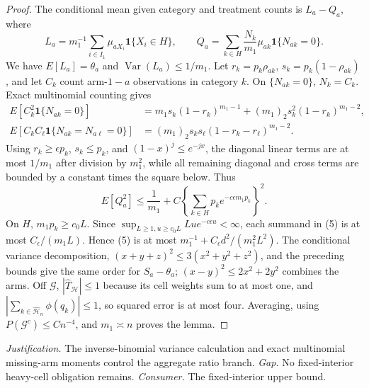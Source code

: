 \documentclass{article}
\begin{document}
\begin{proof}
The conditional mean given category and treatment counts is \(L_a-Q_a\), where
\[
L_a=m_1^{-1}\sum_{i\in I_1}\mu_{aX_i}\mathbf1\{X_i\in H\},\qquad Q_a=\sum_{k\in H}\frac{N_k}{m_1}\mu_{ak}\mathbf1\{N_{ak}=0\}.
\tag{3}
\]
We have \(E[L_a]=\theta_a\) and \(\operatorname{Var}(L_a)\le1/m_1\). Let \(r_k=p_k\rho_{ak}\), \(s_k=p_k(1-\rho_{ak})\), and let \(C_k\) count arm-\(1-a\) observations in category \(k\). On \(\{N_{ak}=0\}\), \(N_k=C_k\). Exact multinomial counting gives
\[
\begin{aligned}
E[C_k^2\mathbf1\{N_{ak}=0\}]&=m_1s_k(1-r_k)^{m_1-1}+(m_1)_2s_k^2(1-r_k)^{m_1-2},\\
E[C_kC_\ell\mathbf1\{N_{ak}=N_{a\ell}=0\}]&=(m_1)_2s_ks_\ell(1-r_k-r_\ell)^{m_1-2}.
\end{aligned}
\tag{4}
\]
Using \(r_k\ge\epsilon p_k\), \(s_k\le p_k\), and \((1-x)^j\le e^{-jx}\), the diagonal linear terms are at most \(1/m_1\) after division by \(m_1^2\), while all remaining diagonal and cross terms are bounded by a constant times the square below. Thus
\[
E[Q_a^2]\le\frac1{m_1}+C\left\{\sum_{k\in H}p_ke^{-c\epsilon m_1p_k}\right\}^2.
\tag{5}
\]
On \(H\), \(m_1p_k\ge c_0L\). Since \(\sup_{L\ge1,u\ge c_0L}Lu e^{-c\epsilon u}<\infty\), each summand in (5) is at most \(C_\epsilon/(m_1L)\). Hence (5) is at most \(m_1^{-1}+C_\epsilon d^2/(m_1^2L^2)\). The conditional variance decomposition, \((x+y+z)^2\le3(x^2+y^2+z^2)\), and the preceding bounds give the same order for \(S_a-\theta_a\); \((x-y)^2\le2x^2+2y^2\) combines the arms. Off \(\mathcal G\), \(|\widehat T_{\mathcal H}|\le1\) because its cell weights sum to at most one, and \(\left|\sum_{k\in\widehat{\mathcal H}_n}\phi(q_k)\right|\le1\), so squared error is at most four. Averaging, using \(P(\mathcal G^c)\le Cn^{-4}\), and \(m_1\asymp n\) proves the lemma.
\end{proof}
\par\smallskip\noindent \textit{Justification.} The inverse-binomial variance calculation and exact multinomial missing-arm moments control the aggregate ratio branch. \textit{Gap.} No fixed-interior heavy-cell obligation remains. \textit{Consumer.} The fixed-interior upper bound.
\end{document}

